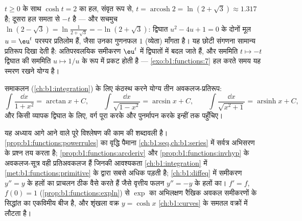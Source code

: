 \begin{example}[संवृत रूप काम पर]\label{ex:b1:functions:arcoshtwo}
$t \geq 0$ के साथ $\cosh t = 2$ का हल, संवृत रूप से, $t =
\operatorname{arcosh} 2 = \ln(2 + \sqrt3) \approx 1.317$ है; दूसरा हल समता
से $-t$ है --- और सचमुच $\ln(2 - \sqrt3) = \ln\frac1{2 + \sqrt3} = -\ln(2 +
\sqrt3)$: द्विघात $u^2 - 4u + 1 = 0$ के दोनों मूल $u = \eu^t$ परस्पर
प्रतिलोम हैं, जैसा उनका गुणनफल $1$ (व्येता) माँगता है। यह छोटी संगणना
सामान्य प्रतिरूप दिखा देती है: अतिपरवलयिक समीकरण $\eu^t$ में द्विघातों में
बदल जाते हैं, और सममिति $t \mapsto -t$ द्विघात की सममिति $u \mapsto 1/u$ के
रूप में प्रकट होती है --- \cref{exo:b1:functions:7} हल करते समय यह स्मरण
रखने योग्य है।
\end{example}

\begin{method}[सही प्राथमिक रूप चुनना]\label{met:b1:functions:primitive}
समाकलन (\cref{ch:b1:integration}) के लिए कंठस्थ करने योग्य तीन
अवकलज-प्रतिरूप:
\[
\int \frac{\dd x}{1 + x^2} = \arctan x + C,
\qquad
\int \frac{\dd x}{\sqrt{1 - x^2}} = \arcsin x + C,
\qquad
\int \frac{\dd x}{\sqrt{x^2 + 1}} = \operatorname{arsinh} x + C,
\]
और किसी व्यापक द्विघात के लिए, वर्ग पूरा करके और पुनर्मापन करके इन्हीं तक
पहुँचिए।
\end{method}

\begin{remark}[यह अध्याय कहाँ काम आता है]\label{rem:b1:functions:whereused}
यह अध्याय आगे आने वाले पूरे विश्लेषण की काम की शब्दावली है।
\cref{prop:b1:functions:powerrules} का वृद्धि पैमाना
\cref{ch:b1:seq,ch:b1:series} में सर्वत्र अभिसरण के प्रश्न तय करता है;
\cref{prop:b1:functions:arcderiv} और \cref{prop:b1:functions:invhyp} के
अवकलज-सूत्र वही प्रतिअवकलज हैं जिनकी आवश्यकता \cref{ch:b1:integration} में
\cref{met:b1:functions:primitive} के द्वारा सबसे अधिक पड़ती है;  \cref{ch:b1:diffeq} में समीकरण $y'' = y$ के हलों का प्राचलन ठीक वैसे
करते हैं जैसे वृत्तीय फलन $y'' = -y$ के हलों का। $f' = f$, $f(0) = 1$
(\cref{prop:b1:functions:expln}) से $\exp$ का अभिलक्षण रैखिक अवकल समीकरणों
के सिद्धांत का एकविमीय बीज है, और शृंखला वक्र $y = \cosh x$
\cref{ch:b1:curves} के समतल वक्रों में लौटता है।
\end{remark}

